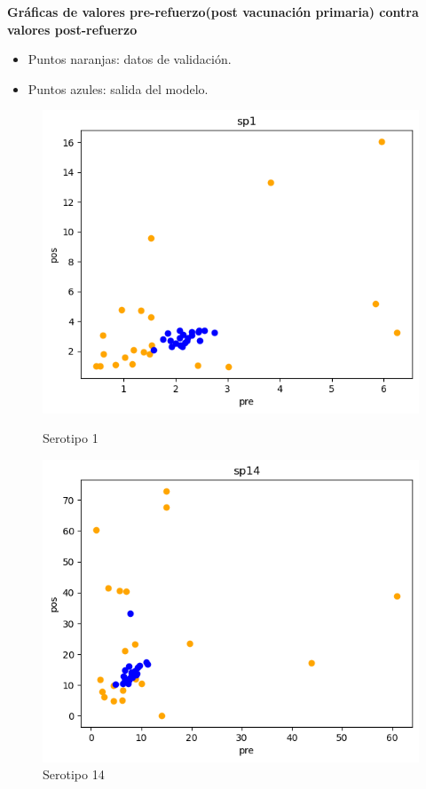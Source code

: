 \textbf{Gráficas de valores pre-refuerzo(post vacunación primaria) contra valores post-refuerzo}
\begin{itemize}
    \item Puntos naranjas: datos de validación.
    \item Puntos azules: salida del modelo.
\end{itemize}
\begin{figure}[h]
    \centering
    \begin{minipage}{0.45\textwidth}
        \centering
        \includegraphics[width=\linewidth]{Graphics/sp1t.png}
        \caption{Serotipo 1}
        \label{fig:sp1t}
    \end{minipage}%
    \hfill
    \begin{minipage}{0.45\textwidth}
        \centering
        \includegraphics[width=\linewidth]{Graphics/sp14t.png}
        \caption{Serotipo 14}
        \label{fig:sp14t}
    \end{minipage}
\end{figure}
